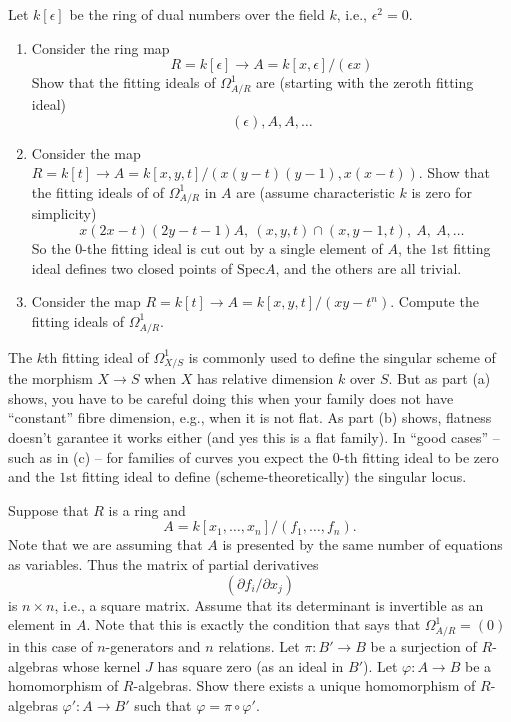 \begin{exercise}
Let $k[\epsilon]$ be the ring of dual numbers
over the field $k$, i.e., $\epsilon^2=0$.
\begin{enumerate}
\item Consider the ring map
$$
R = k[\epsilon] \to A = k[x,\epsilon]/(\epsilon x)
$$
Show that the fitting ideals of $\Omega^1_{A/R}$ are (starting with the
zeroth fitting ideal)
$$
(\epsilon), A, A,\ldots
$$
\item Consider the map $R=k[t] \to 
A=k[x,y,t]/(x(y-t)(y-1),x(x-t))$. Show that the fitting ideals of
of $\Omega^1_{A/R}$ in $A$ are (assume characteristic $k$ is zero
for simplicity)
$$
x(2x-t)(2y-t-1)A,\ (x,y,t)\cap (x,y-1,t),\ A,\ A,\ldots
$$
So the $0$-the fitting ideal is cut out by a single element of $A$,
the $1$st fitting ideal defines two closed points of $\text{Spec} A$, and
the others are all trivial.
\item Consider the map $R=k[t] \to A=k[x,y,t]/(xy-t^n)$.
Compute the fitting ideals of $\Omega^1_{A/R}$.
\end{enumerate}
\end{exercise}

\begin{remark}
The $k$th fitting ideal of $\Omega^1_{X/S}$ is commonly used
to define the singular scheme of the morphism $X \to S$ when $X$ has relative
dimension $k$ over $S$. But as part (a) shows, you have to be careful doing
this when your family does not have ``constant'' fibre dimension, e.g., when 
it is not flat. As part (b) shows, flatness doesn't garantee it works either
(and yes this is a flat family). In ``good cases'' -- such as in (c) -- for
families of curves you expect the $0$-th fitting ideal to be zero and
the $1$st fitting ideal to define (scheme-theoretically) the singular locus.
\end{remark}

\begin{exercise}
Suppose that $R$ is a ring and 
$$
A = k[x_1,\ldots,x_n]/(f_1,\ldots,f_n).
$$
Note that we are assuming that $A$ is presented by the same
number of equations as variables. Thus the matrix of partial
derivatives
$$
( \partial f_i / \partial x_j )
$$
is $n\times n$, i.e., a square matrix. Assume that
its determinant is invertible as an element in $A$. Note that
this is exactly the condition that says that $\Omega^1_{A/R} = (0)$
in this case of $n$-generators and $n$ relations.
Let $\pi : B' \to B$ be a surjection of $R$-algebras 
whose kernel $J$ has square zero (as an ideal in $B'$).
Let $\varphi : A \to B$ be a homomorphism of $R$-algebras. 
Show there exists a unique homomorphism of $R$-algebras
$\varphi' : A \to B'$ such that $\varphi = \pi \circ \varphi'$.
\end{exercise}

